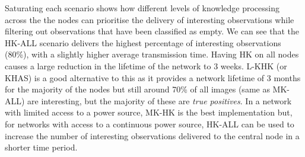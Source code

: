 Saturating each scenario shows how different levels of knowledge processing across the the nodes can prioritise the delivery of interesting observations while filtering out observations that have been classified as empty. We can see that the HK-ALL scenario delivers the highest percentage of interesting observations (80\%), with a slightly higher average transmission time. Having HK on all nodes causes a large reduction in the lifetime of the network to 3 weeks. L-KHK (or KHAS) is a good alternative to this as it provides a network lifetime of 3 months for the majority of the nodes but still around 70\% of all images (same as MK-ALL) are interesting, but the majority of these are \textit{true positives}. In a network with limited access to a power source, MK-HK is the best implementation but, for networks with access to a continuous power source, HK-ALL can be used to increase the number of interesting observations delivered to the central node in a shorter time period.




